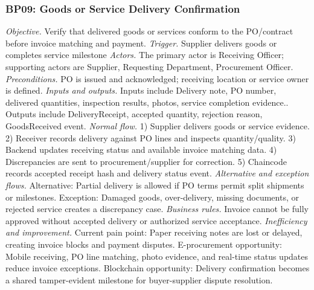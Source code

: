 \documentclass[conference]{IEEEtran}
\begin{document}
\subsubsection{BP09: Goods or Service Delivery Confirmation}
\textit{Objective.} Verify that delivered goods or services conform to the PO/contract before invoice matching and payment.
\textit{Trigger.} Supplier delivers goods or completes service milestone
\textit{Actors.} The primary actor is Receiving Officer; supporting actors are Supplier, Requesting Department, Procurement Officer.
\textit{Preconditions.} PO is issued and acknowledged; receiving location or service owner is defined.
\textit{Inputs and outputs.} Inputs include Delivery note, PO number, delivered quantities, inspection results, photos, service completion evidence.. Outputs include DeliveryReceipt, accepted quantity, rejection reason, GoodsReceived event.
\textit{Normal flow.} 1) Supplier delivers goods or service evidence. 2) Receiver records delivery against PO lines and inspects quantity/quality. 3) Backend updates receiving status and available invoice matching data. 4) Discrepancies are sent to procurement/supplier for correction. 5) Chaincode records accepted receipt hash and delivery status event.
\textit{Alternative and exception flows.} Alternative: Partial delivery is allowed if PO terms permit split shipments or milestones. Exception: Damaged goods, over-delivery, missing documents, or rejected service creates a discrepancy case.
\textit{Business rules.} Invoice cannot be fully approved without accepted delivery or authorized service acceptance.
\textit{Inefficiency and improvement.} Current pain point: Paper receiving notes are lost or delayed, creating invoice blocks and payment disputes. E-procurement opportunity: Mobile receiving, PO line matching, photo evidence, and real-time status updates reduce invoice exceptions. Blockchain opportunity: Delivery confirmation becomes a shared tamper-evident milestone for buyer-supplier dispute resolution.
\end{document}

